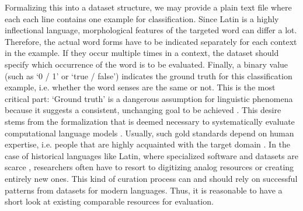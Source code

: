 Formalizing this into a dataset structure, we may provide a plain text file where each each line contains one example for classification. Since Latin is a highly inflectional language, morphological features of the targeted word can differ a lot. Therefore, the actual word forms have to be indicated separately for each context in the example. If they occur multiple times in a context, the dataset should specify which occurrence of the word is to be evaluated. Finally, a binary value (such as `0 / 1' or `true / false') indicates the ground truth for this classification example, i.e. whether the word senses are the same or not. This is the most critical part: `Ground truth' is a dangerous assumption for linguistic phenomena because it suggests a consistent, unchanging goal to be achieved \parencite[129]{leeGeneratingGroundTruth2012}. This desire stems from the formalization that is deemed necessary to systematically evaluate computational language models \parencite[4]{fischerGroundTruthCreation2010}. Usually, such gold standards depend on human expertise, i.e. people that are highly acquainted with the target domain \parencite[519]{uzunerCommunityAnnotationExperiment2010}. In the case of historical languages like Latin, where specialized software and datasets are scarce \parencites[168]{karakantaNeuralMachineTranslation2018}[3]{mcgillivrayMethodsLatinComputational2013}, researchers often have to resort to digitizing analog resources or creating entirely new ones. This kind of curation process can and should rely on successful patterns from datasets for modern languages. Thus, it is reasonable to have a short look at existing comparable resources for evaluation.

